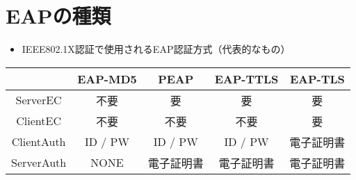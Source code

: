 \section{EAPの種類}
\toc
\begin{frame}[t]{\fft}
    \begin{itemize}
        \item IEEE802.1X認証で使用されるEAP認証方式（代表的なもの）
    \end{itemize}
    \begin{table}
        \centering
        \renewcommand{\arraystretch}{1.5}
        \begin{tabularx}{\textwidth}{cCCCC}
                       & {\scriptsize EAP-MD5} & {\scriptsize PEAP} & {\scriptsize EAP-TTLS} & {\scriptsize EAP-TLS} \\
            \hline
            ServerEC   & 不要                    & 要                  & 要                      & 要                     \\
            ClientEC   & 不要                    & 不要                 & 不要                     & 要                     \\
            ClientAuth & ID / PW               & ID / PW            & ID / PW                & 電子証明書                 \\
            ServerAuth & NONE                  & 電子証明書              & 電子証明書                  & 電子証明書                 \\
            \hline
        \end{tabularx}
    \end{table}
\end{frame}